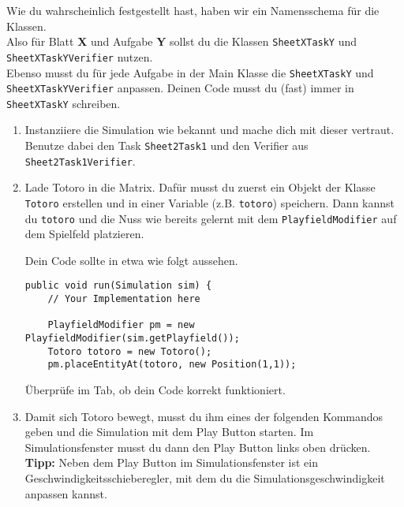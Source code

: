


\begin{Infobox}
    Wie du wahrscheinlich festgestellt hast, haben wir ein Namensschema für die Klassen.\\
    Also für Blatt \textbf{X} und Aufgabe \textbf{Y} sollst du die Klassen \lstinline{SheetXTaskY} und \lstinline{SheetXTaskYVerifier} nutzen.\\
    Ebenso musst du für jede Aufgabe in der Main Klasse die \lstinline{SheetXTaskY} und \lstinline{SheetXTaskYVerifier} anpassen.
    Deinen Code musst du (fast) immer in \lstinline{SheetXTaskY} schreiben.
\end{Infobox}

\begin{enumerate}
    \item Instanziiere die Simulation wie bekannt und mache dich mit dieser vertraut. 
        Benutze dabei den Task \lstinline{Sheet2Task1} und den Verifier aus \lstinline{Sheet2Task1Verifier}.
    \item Lade Totoro in die Matrix.
        Dafür musst du zuerst ein Objekt der Klasse \lstinline{Totoro} erstellen und in einer Variable (z.B. \lstinline{totoro}) speichern.
        Dann kannst du \lstinline{totoro} und die Nuss wie bereits gelernt mit dem \lstinline{PlayfieldModifier} auf dem Spielfeld platzieren.

        Dein Code sollte in etwa wie folgt aussehen.

        \begin{lstlisting}[firstnumber=14]
public void run(Simulation sim) {
    // Your Implementation here

    PlayfieldModifier pm = new PlayfieldModifier(sim.getPlayfield());
    Totoro totoro = new Totoro();
    pm.placeEntityAt(totoro, new Position(1,1));
        \end{lstlisting}

        Überprüfe im  Tab, ob dein Code korrekt funktioniert.
        \item Damit sich Totoro bewegt, musst du ihm eines der folgenden Kommandos geben und die Simulation mit dem Play Button starten. Im Simulationsfenster musst du dann den Play Button links oben drücken. \\
        \textbf{Tipp:} Neben dem Play Button im Simulationsfenster ist ein Geschwindigkeitsschieberegler, mit dem du die Simulationsgeschwindigkeit anpassen kannst.


\end{enumerate}
